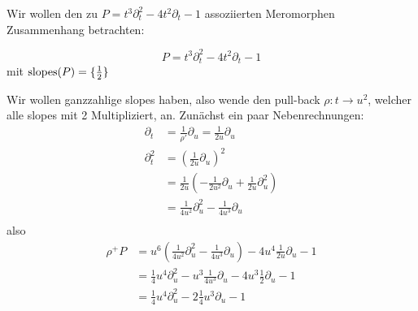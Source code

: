 \begin{exmp}
  Wir wollen den zu $P= t^3\partial_t^2-4t^2\partial_t-1$ assoziierten
  Meromorphen Zusammenhang
  betrachten:\\
  \begin{minipage}[hbt]{0,49\textwidth}
    \[ P= t^3\partial_t^2-4t^2\partial_t-1 \]
    mit $ \operatorname{slopes}(P)=\{\frac{1}{2}\} $
  \end{minipage}
  \begin{minipage}[hbt]{0,49\textwidth}

    \begin{center}
    \end{center}
  \end{minipage}
  Wir wollen ganzzahlige slopes haben, also wende den pull-back
  $\rho:t\rightarrow u^2$, welcher alle slopes mit 2 Multipliziert,
  an.
  Zunächst ein paar Nebenrechnungen: 
  \begin{align*}
    \partial_t   &= \frac{1}{\rho'}\partial_u=\frac{1}{2u}\partial_u \\
    \partial_t^2 &= (\frac{1}{2u}\partial_u)^2\\
                 &= \frac{1}{2u}(-\frac{1}{2u^2}\partial_u + 
                   \frac{1}{2u}\partial_u^2) \\
                 &= \frac{1}{4u^2}\partial_u^2-\frac{1}{4u^3}\partial_u \\
  \end{align*}
  also
  \begin{align*}
    \rho^+P &= u^6(\frac{1}{4u^2}\partial_u^2-\frac{1}{4u^3}\partial_u)- 
              4u^{4}\frac{1}{2u}\partial_u-1\\
            &= \frac{1}{4}u^4\partial_u^2-u^3\frac{1}{4u^3}\partial_u-
              4u^{3}\frac{1}{2}\partial_u-1\\
            &= \frac{1}{4}u^4\partial_u^2 -2\frac{1}{4}u^3\partial_u-1
  \end{align*}


\end{exmp}
